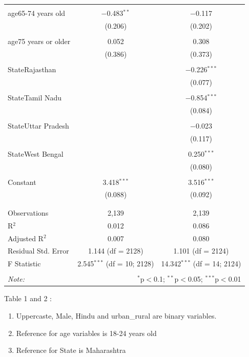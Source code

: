 \documentclass[
]{article}
\providecommand{\tightlist}{%
  \setlength{\itemsep}{0pt}\setlength{\parskip}{0pt}}
\begin{document}
\begin{table}[!htbp]
\begin{tabular}{@{\extracolsep{5pt}}lcc}
  & & \\ 
 age65-74 years old & $-$0.483$^{**}$ & $-$0.117 \\ 
  & (0.206) & (0.202) \\ 
  & & \\ 
 age75 years or older & 0.052 & 0.308 \\ 
  & (0.386) & (0.373) \\ 
  & & \\ 
 StateRajasthan &  & $-$0.226$^{***}$ \\ 
  &  & (0.077) \\ 
  & & \\ 
 StateTamil Nadu &  & $-$0.854$^{***}$ \\ 
  &  & (0.084) \\ 
  & & \\ 
 StateUttar Pradesh &  & $-$0.023 \\ 
  &  & (0.117) \\ 
  & & \\ 
 StateWest Bengal &  & 0.250$^{***}$ \\ 
  &  & (0.080) \\ 
  & & \\ 
 Constant & 3.418$^{***}$ & 3.516$^{***}$ \\ 
  & (0.088) & (0.092) \\ 
  & & \\ 
\hline \\[-1.8ex] 
Observations & 2,139 & 2,139 \\ 
R$^{2}$ & 0.012 & 0.086 \\ 
Adjusted R$^{2}$ & 0.007 & 0.080 \\ 
Residual Std. Error & 1.144 (df = 2128) & 1.101 (df = 2124) \\ 
F Statistic & 2.545$^{***}$ (df = 10; 2128) & 14.342$^{***}$ (df = 14; 2124) \\ 
\hline 
\hline \\[-1.8ex] 
\textit{Note:}  & \multicolumn{2}{r}{$^{*}$p$<$0.1; $^{**}$p$<$0.05; $^{***}$p$<$0.01} \\ 
\end{tabular} 
\end{table} 
\endgroup

Table 1 and 2 :

\begin{enumerate}
\def\labelenumi{\arabic{enumi}.}
\tightlist
\item
  Uppercaste, Male, Hindu and urban\_rural are binary variables.
\item
  Reference for age variables is 18-24 years old
\item
  Reference for State is Maharashtra
\end{enumerate}
\end{document}
